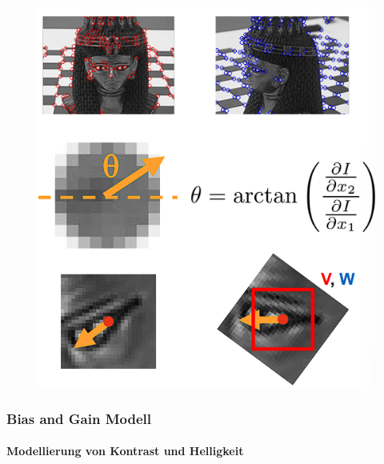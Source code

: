 \documentclass[12pt, a4paper, oneside]{article}
\begin{document}
\begin{figure}[htbp]
    \centering
    \includegraphics[scale=1]{../img/1-18.png}
    \label{img/1-18}
\end{figure}

\subsubsection{Bias and Gain Modell}
\paragraph*{Modellierung von Kontrast und Helligkeit}
\end{document}
